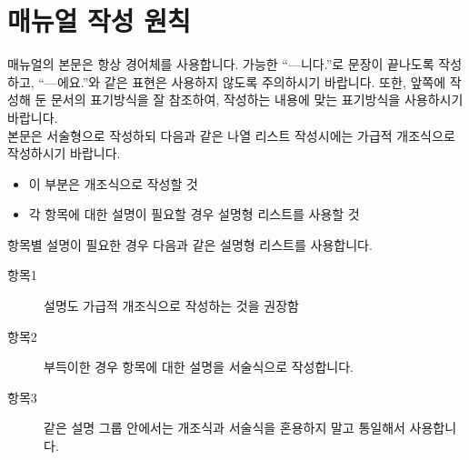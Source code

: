 
\chapter{매뉴얼 작성 원칙}
매뉴얼의 본문은 항상 경어체를 사용합니다. 가능한 ``---니다.''로 문장이 끝나도록 작성하고,
``---에요.''와 같은 표현은 사용하지 않도록 주의하시기 바랍니다. 또한, 앞쪽에 작성해 둔 문서의
표기방식을 잘 참조하여, 작성하는 내용에 맞는 표기방식을 사용하시기 바랍니다.\\

본문은 서술형으로 작성하되 다음과 같은 나열 리스트 작성시에는 가급적 개조식으로 작성하시기 바랍니다.
\begin{itemize}
    \item 이 부분은 개조식으로 작성할 것
    \item 각 항목에 대한 설명이 필요할 경우 설명형 리스트를 사용할 것 \\
\end{itemize}

항목별 설명이 필요한 경우 다음과 같은 설명형 리스트를 사용합니다.

\begin{description}
    \item[항목1] 설명도 가급적 개조식으로 작성하는 것을 권장함
    \item[항목2] 부득이한 경우 항목에 대한 설명을 서술식으로 작성합니다.
    \item[항목3] 같은 설명 그룹 안에서는 개조식과 서술식을 혼용하지 말고 통일해서 사용합니다.
\end{description}
